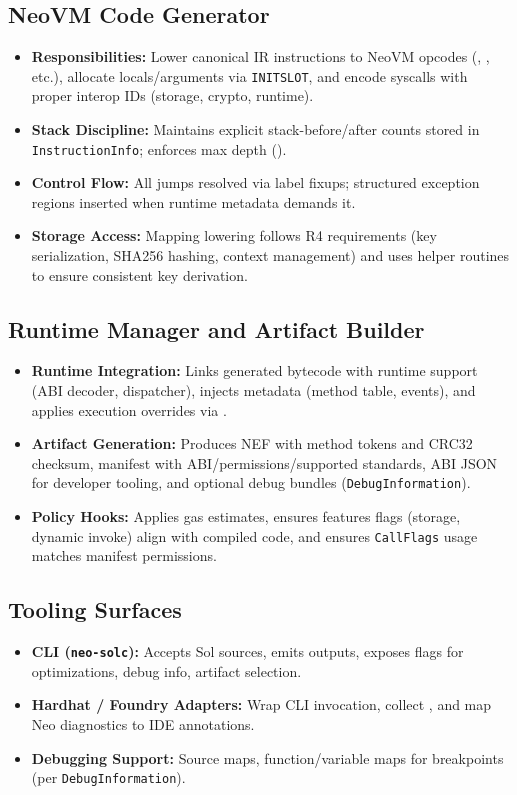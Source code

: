 \documentclass[11pt]{article}
\begin{document}
\subsection{NeoVM Code Generator}
\begin{itemize}
\item \textbf{Responsibilities:} Lower canonical IR instructions to NeoVM opcodes (, , etc.), allocate locals/arguments via \texttt{INITSLOT}, and encode syscalls with proper interop IDs (storage, crypto, runtime).
    \item \textbf{Stack Discipline:} Maintains explicit stack-before/after counts stored in \texttt{InstructionInfo}; enforces max depth ().
    \item \textbf{Control Flow:} All jumps resolved via label fixups; structured exception regions inserted when runtime metadata demands it.
    \item \textbf{Storage Access:} Mapping lowering follows R4 requirements (key serialization, SHA256 hashing, context management) and uses helper routines to ensure consistent key derivation.
\end{itemize}

\subsection{Runtime Manager and Artifact Builder}
\begin{itemize}
    \item \textbf{Runtime Integration:} Links generated bytecode with runtime support (ABI decoder, dispatcher), injects metadata (method table, events), and applies execution overrides via .
    \item \textbf{Artifact Generation:} Produces NEF with method tokens and CRC32 checksum, manifest with ABI/permissions/supported standards, ABI JSON for developer tooling, and optional debug bundles (\texttt{DebugInformation}).
    \item \textbf{Policy Hooks:} Applies gas estimates, ensures features flags (storage, dynamic invoke) align with compiled code, and ensures \texttt{CallFlags} usage matches manifest permissions.
\end{itemize}

\subsection{Tooling Surfaces}
\begin{itemize}
    \item \textbf{CLI (\texttt{neo-solc}):} Accepts Sol sources, emits outputs, exposes flags for optimizations, debug info, artifact selection.
    \item \textbf{Hardhat / Foundry Adapters:} Wrap CLI invocation, collect , and map Neo diagnostics to IDE annotations.
    \item \textbf{Debugging Support:} Source maps, function/variable maps for breakpoints (per \texttt{DebugInformation}).
\end{itemize}
\end{document}
